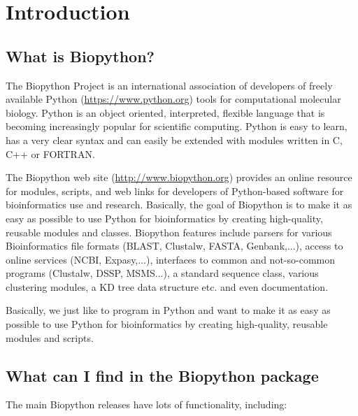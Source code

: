 \chapter{Introduction}
\label{chapter:introduction}

\section{What is Biopython?}

The Biopython Project is an international association of developers of freely available Python (\url{https://www.python.org}) tools for computational molecular biology. Python is an object oriented, interpreted, flexible language that is becoming increasingly popular for scientific computing. Python is easy to learn, has a very clear syntax and can easily be extended with modules written in C, C++ or FORTRAN.

The Biopython web site (\url{http://www.biopython.org}) provides
an online resource for modules, scripts, and web links for developers
of Python-based software for bioinformatics use and research. Basically,
the goal of Biopython is to make it as easy as possible to use Python
for bioinformatics by creating high-quality, reusable modules and
classes. Biopython features include parsers for various Bioinformatics
file formats (BLAST, Clustalw, FASTA, Genbank,...), access to online
services (NCBI, Expasy,...), interfaces to common and not-so-common
programs (Clustalw, DSSP, MSMS...), a standard sequence class, various
clustering modules, a KD tree data structure etc. and even documentation.

Basically, we just like to program in Python and want to make it as easy as possible to use Python for bioinformatics by creating high-quality, reusable modules and scripts.

\section{What can I find in the Biopython package}

The main Biopython releases have lots of functionality, including:

